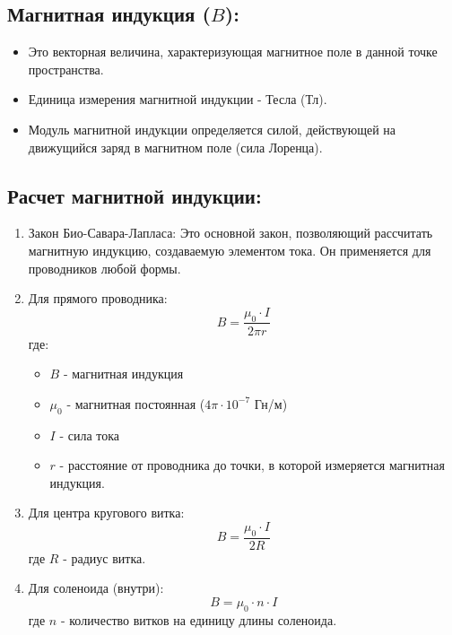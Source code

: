 \documentclass[a4paper,12pt]{article}
\begin{document}
\vspace{-9pt}
\subsection*{Магнитная индукция ($B$):}
\vspace{-3pt}
\begin{itemize}
    \item Это векторная величина, характеризующая магнитное поле в данной точке пространства.
    \item Единица измерения магнитной индукции - Тесла (Тл).
    \item Модуль магнитной индукции определяется силой, действующей на движущийся заряд в магнитном поле (сила Лоренца).
\end{itemize}

\vspace{-9pt}
\subsection*{Расчет магнитной индукции:}
\vspace{-3pt}
\begin{enumerate}[itemsep=0pt, topsep=0pt, parsep=3pt]
    \item Закон Био-Савара-Лапласа: Это основной закон, позволяющий рассчитать магнитную индукцию, создаваемую элементом тока. Он применяется для проводников любой формы.
    \item Для прямого проводника:
    \vspace{-0.05em}
    $$ B = \frac{\mu_0 \cdot I}{2\pi r} $$
    где:
    \begin{itemize}
        \item $B$ - магнитная индукция
        \item $\mu_0$ - магнитная постоянная ($4\pi \cdot 10^{-7}$ Гн/м)
        \item $I$ - сила тока
        \item $r$ - расстояние от проводника до точки, в которой измеряется магнитная индукция.
    \end{itemize}
    \item Для центра кругового витка:
    \vspace{-0.05em}
    $$ B = \frac{\mu_0 \cdot I}{2R} $$
    где $R$ - радиус витка.
    \item Для соленоида (внутри):
    \vspace{-0.05em}
    $$ B = \mu_0 \cdot n \cdot I $$
    где $n$ - количество витков на единицу длины соленоида.
\end{enumerate}
\end{document}

